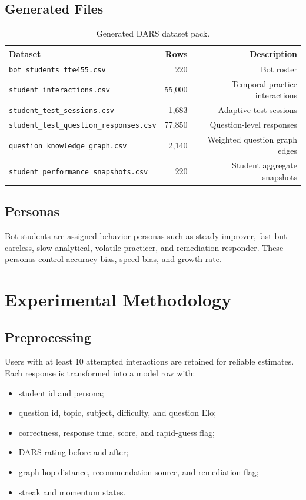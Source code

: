 \documentclass[12pt,a4paper]{report}
\begin{document}
\section{Generated Files}
\begin{table}[h]
\centering
\caption{Generated DARS dataset pack.}
\begin{tabular}{lrr}
\toprule
Dataset & Rows & Description \\
\midrule
\texttt{bot\_students\_fte455.csv} & 220 & Bot roster \\
\texttt{student\_interactions.csv} & 55,000 & Temporal practice interactions \\
\texttt{student\_test\_sessions.csv} & 1,683 & Adaptive test sessions \\
\texttt{student\_test\_question\_responses.csv} & 77,850 & Question-level responses \\
\texttt{question\_knowledge\_graph.csv} & 2,140 & Weighted question graph edges \\
\texttt{student\_performance\_snapshots.csv} & 220 & Student aggregate snapshots \\
\bottomrule
\end{tabular}
\end{table}

\section{Personas}
Bot students are assigned behavior personas such as steady improver, fast but careless, slow analytical, volatile practicer, and remediation responder. These personas control accuracy bias, speed bias, and growth rate.

\chapter{Experimental Methodology}
\section{Preprocessing}
Users with at least 10 attempted interactions are retained for reliable estimates. Each response is transformed into a model row with:

\begin{itemize}[leftmargin=*]
  \item student id and persona;
  \item question id, topic, subject, difficulty, and question Elo;
  \item correctness, response time, score, and rapid-guess flag;
  \item DARS rating before and after;
  \item graph hop distance, recommendation source, and remediation flag;
  \item streak and momentum states.
\end{itemize}
\end{document}
